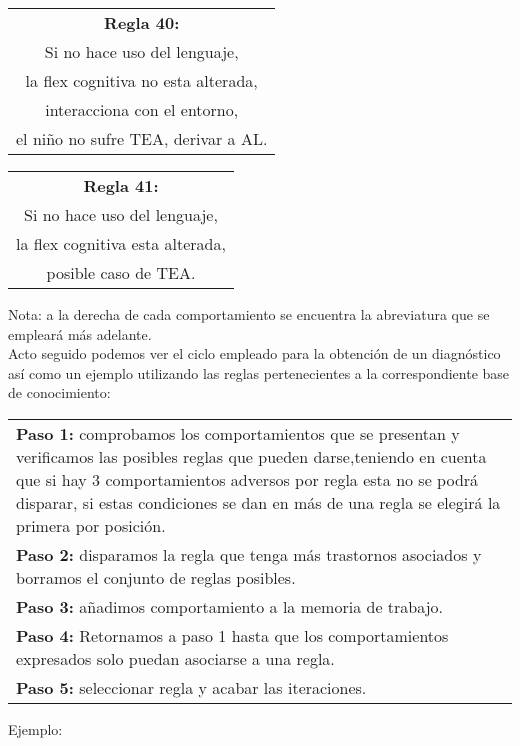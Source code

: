 \documentclass[letterpaper,12pt]{article}
\begin{document}
\begin{center}
	\begin{tabular}{|c|}
		\hline 
		\textbf{Regla 40:} \\
		Si no hace uso del lenguaje,\\
		la flex cognitiva no esta alterada,\\
		interacciona con el entorno,\\
		el niño no sufre TEA, derivar a AL.\\
\hline 
\end{tabular} 
\end{center}		
		
\begin{center}
	\begin{tabular}{|c|}
		\hline 
		\textbf{Regla 41:} \\
		Si no hace uso del lenguaje,\\
		la flex cognitiva esta alterada,\\
		posible caso de TEA. \\
\hline 
\end{tabular} 
\end{center}

Nota: a la derecha de cada comportamiento se encuentra la abreviatura que
se empleará más adelante. \\

Acto seguido podemos ver el ciclo empleado para la obtención de un
diagnóstico así como un ejemplo utilizando las reglas pertenecientes a la correspondiente base de conocimiento: \\

\begin{center}
\begin{tabular}{|p{15cm}|}
\hline 
\textbf{Paso 1:} comprobamos los comportamientos que se presentan y verificamos las posibles reglas que pueden darse,teniendo en cuenta que si hay 3 comportamientos adversos por regla esta no se podrá disparar, si estas condiciones se dan en más de una regla se elegirá la primera por posición. \\
\textbf{Paso 2:} disparamos la regla que tenga más trastornos asociados y borramos el conjunto de reglas posibles.\\
\textbf{Paso 3:} añadimos comportamiento a la memoria de trabajo. \\
\textbf{Paso 4:} Retornamos a paso 1 hasta que los comportamientos expresados solo puedan asociarse a una regla.\\
\textbf{Paso 5:} seleccionar regla y acabar las iteraciones. \\ 
\hline 
\end{tabular} 
\end{center}
\newpage
Ejemplo: \\
\end{document}
